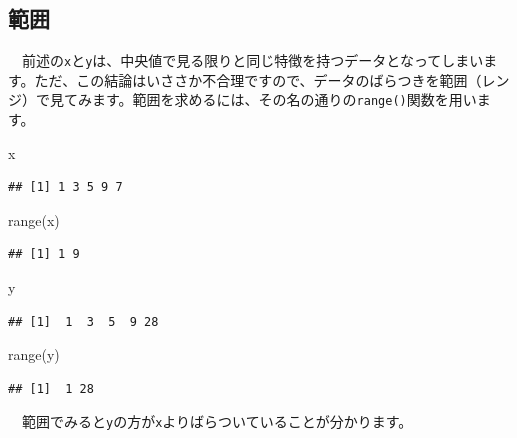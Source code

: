 \documentclass[
  12pt,
]{book}
\newenvironment{Shaded}{\begin{snugshade}}{\end{snugshade}}
\newcommand{\FunctionTok}[1]{\textcolor[rgb]{0.00,0.00,0.00}{#1}}
\newcommand{\NormalTok}[1]{#1}
\begin{document}
\hypertarget{ux7bc4ux56f2}{%
\subsection{\texorpdfstring{範囲}{範囲}}\label{ux7bc4ux56f2}}

　前述の\texttt{x}と\texttt{y}は、中央値で見る限りと同じ特徴を持つデータとなってしまいます。ただ、この結論はいささか不合理ですので、データのばらつきを範囲（レンジ）で見てみます。範囲を求めるには、その名の通りの\texttt{range()}関数を用います。

\begin{Shaded}
\begin{Highlighting}[numbers=left,,]
\NormalTok{x}
\end{Highlighting}
\end{Shaded}

\begin{verbatim}
## [1] 1 3 5 9 7
\end{verbatim}

\begin{Shaded}
\begin{Highlighting}[numbers=left,,]
\FunctionTok{range}\NormalTok{(x)}
\end{Highlighting}
\end{Shaded}

\begin{verbatim}
## [1] 1 9
\end{verbatim}

\begin{Shaded}
\begin{Highlighting}[numbers=left,,]
\NormalTok{y}
\end{Highlighting}
\end{Shaded}

\begin{verbatim}
## [1]  1  3  5  9 28
\end{verbatim}

\begin{Shaded}
\begin{Highlighting}[numbers=left,,]
\FunctionTok{range}\NormalTok{(y)}
\end{Highlighting}
\end{Shaded}

\begin{verbatim}
## [1]  1 28
\end{verbatim}

　範囲でみると\texttt{y}の方が\texttt{x}よりばらついていることが分かります。
\end{document}
